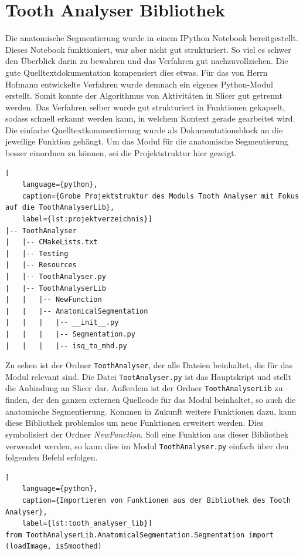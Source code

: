 \section{Tooth Analyser Bibliothek}
Die anatomische Segmentierung wurde in einem IPython Notebook bereitgestellt. Dieses
Notebook funktioniert, war aber nicht gut strukturiert. So viel es schwer den Überblick
darin zu bewahren und das Verfahren gut nachzuvollziehen. Die gute
Quelltextdokumentation kompensiert dies etwas. Für das von Herrn Hofmann entwickelte
Verfahren wurde demnach ein eigenes Python-Modul erstellt. Somit konnte der
Algorithmus von Aktivitäten in Slicer gut getrennt werden. Das Verfahren selber wurde
gut strukturiert in Funktionen gekapselt, sodass schnell erkannt werden kann, in
welchem Kontext gerade gearbeitet wird. Die einfache Quelltextkommentierung
wurde als Dokumentationsblock an die jeweilige Funktion gehängt. Um das Modul für
die anatomische Segmentierung besser einordnen zu können, sei die
Projektstruktur hier gezeigt.

\begin{lstlisting}[
    language={python},
    caption={Grobe Projektstruktur des Moduls Tooth Analyser mit Fokus auf die ToothAnalyserLib},
    label={lst:projektverzeichnis}]
|-- ToothAnalyser
|   |-- CMakeLists.txt
|   |-- Testing
|   |-- Resources
|   |-- ToothAnalyser.py
|   |-- ToothAnalyserLib
|   |   |-- NewFunction
|   |   |-- AnatomicalSegmentation
|   |   |   |-- __init__.py
|   |   |   |-- Segmentation.py
|   |   |   |-- isq_to_mhd.py
\end{lstlisting}

Zu sehen ist der Ordner \texttt{ToothAnalyser}, der alle Dateien beinhaltet, die
für das Modul relevant sind. Die Datei \texttt{TootAnalyser.py} ist das
Hauptskript und stellt die Anbindung an Slicer dar. Außerdem ist der Ordner \texttt{ToothAnalyserLib}
zu finden, der den ganzen externen Quellcode für das Modul beinhaltet, so auch
die anatomische Segmentierung. Kommen in Zukunft weitere Funktionen dazu, kann
diese Bibliothek problemlos um neue Funktionen erweitert werden. Dies symbolisiert
der Ordner \textsl{NewFunction}. Soll eine Funktion aus dieser Bibliothek verwendet
werden, so kann dies im Modul \texttt{ToothAnalyser.py} einfach über den folgenden
Befehl erfolgen.

\begin{lstlisting}[
    language={python},
    caption={Importieren von Funktionen aus der Bibliothek des Tooth Analyser},
    label={lst:tooth_analyser_lib}]
from ToothAnalyserLib.AnatomicalSegmentation.Segmentation import (loadImage, isSmoothed)
\end{lstlisting}


